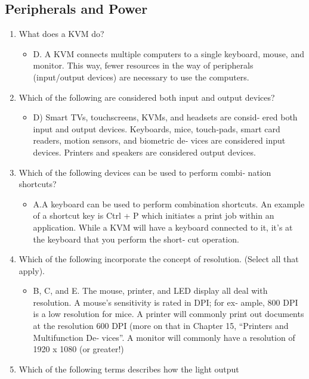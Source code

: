 \documentclass{article}
\begin{document}
\subsection{Peripherals and Power}
\begin{enumerate}
    \item What does a KVM do?
    \begin{itemize}
        \item D. A KVM connects multiple computers to a single keyboard,
mouse, and monitor. This way, fewer resources in the way of
peripherals (input/output devices) are necessary to use the
computers.
    \end{itemize}
    \item Which of the following are considered both input and output
devices?
    \begin{itemize}
        \item D) Smart TVs, touchscreens, KVMs, and headsets are consid‐
ered both input and output devices. Keyboards, mice, touch‐pads, smart card readers, motion sensors, and biometric de‐
vices are considered input devices. Printers and speakers are
considered output devices.
    \end{itemize}
    \item Which of the following devices can be used to perform combi‐
nation shortcuts?
    \begin{itemize}
        \item A.A keyboard can be used to perform combination shortcuts.
An example of a shortcut key is Ctrl + P which initiates a print
job within an application. While a KVM will have a keyboard
connected to it, it’s at the keyboard that you perform the short‐
cut operation.
    \end{itemize}
    \item Which of the following incorporate the concept of resolution.
(Select all that apply).
    \begin{itemize}
        \item B, C, and E. The mouse, printer, and LED display all deal
with resolution. A mouse’s sensitivity is rated in DPI; for ex‐
ample, 800 DPI is a low resolution for mice. A printer will
commonly print out documents at the resolution 600 DPI
(more on that in Chapter 15, “Printers and Multifunction De‐
vices”. A monitor will commonly have a resolution of 1920 x
1080 (or greater!)
    \end{itemize}
    \item Which of the following terms describes how the light output

\end{enumerate}
\end{document}
